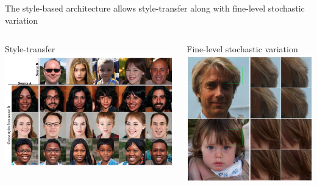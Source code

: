 \documentclass[8pt,xcolor=table,aspectratio=169]{beamer}
\begin{document}
\begin{frame}{The style-based architecture allows style-transfer along with fine-level stochastic variation}

\begin{columns}
\begin{column}{0.6\textwidth}
\centering
Style-transfer
\includegraphics[width=\columnwidth]{Afh1Rkf.jpg}

\end{column}
\begin{column}{0.4\textwidth}
\centering
Fine-level stochastic variation
\includegraphics[width=\columnwidth]{VGY5xB7.png}

\end{column}
\end{columns}
\end{frame}
\end{document}
